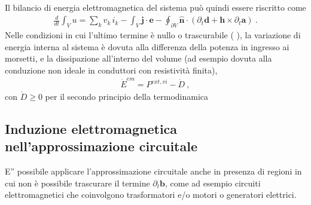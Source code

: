 \documentclass[letterpaper,10pt,italian]{jupyterBook}
\begin{document}
\sphinxAtStartPar
Il bilancio di energia elettromagnetica del sistema può quindi essere riscritto come
\begin{equation*}
\begin{split}\frac{d}{dt} \int_V u = \sum_k v_k \, i_k - \int_{V} \mathbf{j} \cdot \mathbf{e} - \oint_{\partial V} \hat{\mathbf{n}} \cdot \left( \partial_t \mathbf{d} + \mathbf{h} \times \partial_t \mathbf{a} \right) \ .\end{split}
\end{equation*}
\sphinxAtStartPar
Nelle condizioni in cui l’ultimo termine è nullo o trascurabile ( ), la variazione di energia interna al sistema è dovuta alla differenza della potenza in ingresso ai morsetti, e la dissipazione all’interno del volume (ad esempio dovuta alla conduzione non ideale in conduttori con resistività finita),
\begin{equation*}
\begin{split}\dot{E}^{em} = P^{ext, vi} - \dot{D} \ ,\end{split}
\end{equation*}
\sphinxAtStartPar
con \(\dot{D} \ge 0\) per il secondo principio della termodinamica  

\sphinxstepscope




\subsection{Induzione elettromagnetica nell’approssimazione circuitale}
\label{\detokenize{ch/circuits-electric-induction:induzione-elettromagnetica-nell-approssimazione-circuitale}}\label{\detokenize{ch/circuits-electric-induction:classical-electromagnetism-circuits-electric-induction}}\label{\detokenize{ch/circuits-electric-induction::doc}}
\sphinxAtStartPar
E” possibile applicare l’approssimazione circuitale anche in presenza di regioni in cui non è possibile trascurare il termine \(\partial_t \mathbf{b}\), come ad esempio circuiti elettromagnetici che coinvolgono trasformatori e/o motori o generatori elettrici.
\end{document}
